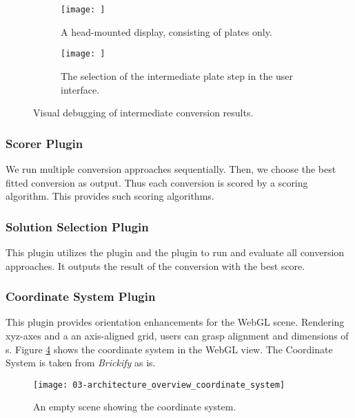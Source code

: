 \documentclass[../03-Architecture.tex]{subfiles}
\begin{document}
\begin{figure}[h]
  \centering
  \begin{subfigure}[a]{0.48\textwidth}
    \texttt{[image: ]}
    \caption{A head-mounted display, consisting of plates only.}
    \label{fig:steps:plate}
  \end{subfigure}
  \begin{subfigure}[b]{0.48\textwidth}
    \texttt{[image: ]}
    \caption{The selection of the intermediate plate step in
      the user interface.}
    \label{fig:steps:ui}
  \end{subfigure}
  \label{fig:steps}
  \caption{Visual debugging of intermediate conversion results.}
\end{figure}

\subsubsection{Scorer Plugin}

We run multiple conversion approaches sequentially. Then, we choose
the best fitted conversion as output. Thus each conversion
is scored by a scoring algorithm. This
 provides such scoring algorithms.

\subsubsection{Solution Selection Plugin}

This plugin utilizes the  plugin and
the  plugin to run and evaluate all conversion
approaches. It outputs the result of the conversion with the
best score.

\subsubsection{Coordinate System Plugin}

This plugin provides orientation enhancements for the WebGL
scene. Rendering xyz-axes and a an axis-aligned grid, users
can grasp alignment and dimensions of {\threedmodel}s.
Figure \ref{fig:architecture_overview_coordinate_system}
shows the coordinate system in the WebGL view. The
Coordinate System is taken from \emph{Brickify} as
is\cite{}.

\begin{figure}
  \texttt{[image: 03-architecture\_overview\_coordinate\_system]}
  \caption{An empty scene showing the coordinate system.}
  \label{fig:architecture_overview_coordinate_system}
\end{figure}
\end{document}
